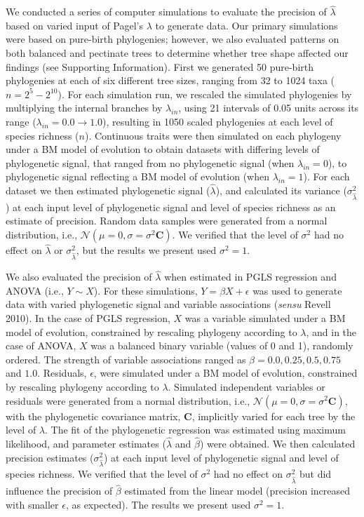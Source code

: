 \documentclass[]{article}
\begin{document}
We conducted a series of computer simulations to evaluate the precision
of \(\hat{\lambda}\) based on varied input of Pagel's \(\lambda\) to
generate data. Our primary simulations were based on pure-birth
phylogenies; however, we also evaluated patterns on both balanced and
pectinate trees to determine whether tree shape affected our findings
(see Supporting Information). First we generated 50 pure-birth
phylogenies at each of six different tree sizes, ranging from 32 to 1024
taxa (\(n=2^5 - 2^{10}\)). For each simulation run, we rescaled the
simulated phylogenies by multiplying the internal branches by
\(\lambda_{in}\), using 21 intervals of 0.05 units across its range
(\(\lambda_{in} = 0.0 \to 1.0\)), resulting in 1050 scaled phylogenies
at each level of species richness (\(n\)). Continuous traits were then
simulated on each phylogeny under a BM model of evolution to obtain
datasets with differing levels of phylogenetic signal, that ranged from
no phylogenetic signal (when \(\lambda_{in} =0\)), to phylogenetic
signal reflecting a BM model of evolution (when \(\lambda_{in} =1\)).
For each dataset we then estimated phylogenetic signal
(\(\hat{\lambda}\)), and calculated its variance
(\(\sigma^2_{\hat{\lambda}}\)) at each input level of phylogenetic
signal and level of species richness as an estimate of precision. Random
data samples were generated from a normal distribution, i.e.,
\(\mathcal{N}(\mu=0,\sigma=\sigma^2\mathbf{C})\). We verified that the
level of \(\sigma^2\) had no effect on \(\hat{\lambda}\) or
\(\sigma^2_{\hat{\lambda}}\), but the results we present used
\(\sigma^2=1\). \hfill\break

We also evaluated the precision of \(\hat{\lambda}\) when estimated in
PGLS regression and ANOVA (i.e., \(Y\sim{X}\)). For these simulations,
\(Y=\beta{X}+\epsilon\) was used to generate data with varied
phylogenetic signal and variable associations (\emph{sensu} Revell
2010). In the case of PGLS regression, \(X\) was a variable simulated
under a BM model of evolution, constrained by rescaling phylogeny
according to \(\lambda\), and in the case of ANOVA, \(X\) was a balanced
binary variable (values of 0 and 1), randomly ordered. The strength of
variable associations ranged as \(\beta=0.0,0.25, 0.5, 0.75\) and
\(1.0\). Residuals, \(\epsilon\), were simulated under a BM model of
evolution, constrained by rescaling phylogeny according to \(\lambda\).
Simulated independent variables or residuals were generated from a
normal distribution, i.e.,
\(\mathcal{N}(\mu=0,\sigma=\sigma^2\mathbf{C})\), with the phylogenetic
covariance matrix, \(\mathbf{C}\), implicitly varied for each tree by
the level of \(\lambda\). The fit of the phylogenetic regression was
estimated using maximum likelihood, and parameter estimates
(\(\hat{\lambda}\) and \(\hat{\beta}\)) were obtained. We then
calculated precision estimates (\(\sigma^2_{\hat{\lambda}}\)) at each
input level of phylogenetic signal and level of species richness. We
verified that the level of \(\sigma^2\) had no effect on
\(\sigma^2_{\hat{\lambda}}\) but did influence the precision of
\(\hat{\beta}\) estimated from the linear model (precision increased
with smaller \(\epsilon\), as expected). The results we present used
\(\sigma^2=1\). \hfill\break
\end{document}
